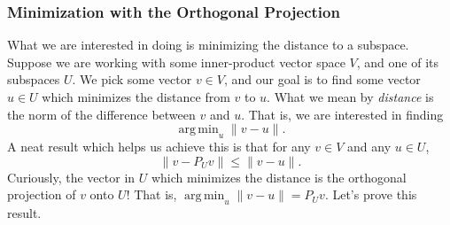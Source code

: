 \documentclass{article}
\theoremstyle{definition}
\DeclareMathOperator*{\argmin}{arg\,min}
\begin{document}
\subsubsection{Minimization with the Orthogonal Projection}
\label{sec: minimization-with-orthogonal-projection}

What we are interested in doing is minimizing the distance to a subspace. Suppose we are working with some inner-product vector space $V$, and one of its subspaces $U$. We pick some vector $v \in V$, and our goal is to find some vector $u \in U$ which minimizes the distance from $v$ to $u$. What we mean by \textit{distance} is the norm of the difference between $v$ and $u$. That is, we are interested in finding $$\argmin_u \|v - u\|.$$ A neat result which helps us achieve this is that for any $v \in V$ and any $u \in U$, $$\|v - P_Uv\| \leq \|v - u \|.$$ Curiously, the vector in $U$ which minimizes the distance is the orthogonal projection of $v$ onto $U$! That is, $\argmin_u \|v - u\| = P_Uv$. Let's prove this result.
\end{document}

